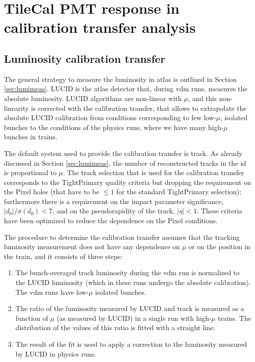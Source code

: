 \chapter{TileCal PMT response in calibration transfer analysis}
\label{app:pmt}

\section{Luminosity calibration transfer}

The general strategy to measure the luminosity in \gls{atlas} is outlined in Section \ref{sec:lumimeas}.
LUCID is the \gls{atlas} detector that, during \gls{vdm} runs, measures the absolute luminosity. 
LUCID algorithms are non-linear with $\mu$, and this non-linearity is corrected with the calibration transfer, 
that 
allows to extrapolate the absolute LUCID calibration from conditions corresponding to few low-$\mu$, isolated bunches 
to the conditions of the physics runs, where we have many high-$\mu$ bunches in trains. 

The default system used to provide the calibration transfer is track. As already discussed in Section \ref{sec:lumimeas},
the number of reconstructed tracks in the \gls{id} is proportional to $\mu$. 
The track selection that is used for the calibration transfer corresponds to the TightPrimary quality criteria but dropping 
the requirement on the Pixel holes (that have to be $\leq 1$ for the standard TightPrimary selection);
furthermore there is a requirement on the impact parameter significance, $|d_0|/\sigma(d_0)<7$, and on 
the pseudorapidity of the track, $|\eta|<1$. These criteria have been optimized to reduce the dependence on the Pixel conditions. 

The procedure to determine the calibration transfer assumes that the tracking luminosity measurement 
does not have any dependence on $\mu$ or on the position in the train, and it consists of three steps:
\begin{enumerate}
\item The bunch-averaged track luminosity during the \gls{vdm} run is normalized to the LUCID luminosity (which in these runs 
undergo the absolute calibration). The \gls{vdm} runs have low-$\mu$ isolated bunches.
\item The ratio of the luminosity measured by LUCID and track is measured as a function of $\mu$ (as measured by LUCID) 
in a single run with high-$\mu$ trains. The distribution of the values of this ratio is fitted with a straight line.
\item The result of the fit is used to apply a correction to the luminosity measured by LUCID in physics runs. 
\end{enumerate}

